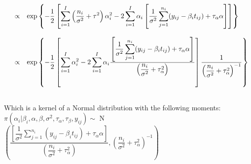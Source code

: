 \documentclass{article}
\begin{document}
\begin{equation*}
\begin{array}{lcl ll }
& \propto & \mbox{exp}\left\{ - \dfrac{1}{2} \left[ \displaystyle\sum_{i=1}^{I} \left(\dfrac{n_i}{\sigma^2} + \tau^2\right) \alpha_i^2 - 2\displaystyle\sum_{i=1}^{I} \alpha_i \left[ \dfrac{1}{\sigma^2}\displaystyle\sum_{j=1}^{n_i}( y_{ij} - \beta_i t_{ij}) + \tau_{\alpha} \alpha \right]\right]\right\} \\ \\

& \propto & \mbox{exp}\left\{ - \dfrac{1}{2} \left[ \displaystyle\sum_{i=1}^{I} \alpha_i^2 - 2\displaystyle\sum_{i=1}^{I} \alpha_i \dfrac{\left[ \dfrac{1}{\sigma^2}\displaystyle\sum_{j=1}^{n_i}( y_{ij} - \beta_i t_{ij}) + \tau_{\alpha} \alpha \right]}{\left(\dfrac{n_i}{\sigma^2} + \tau_{\alpha}^2\right)}\right] \dfrac{1}{\left(\dfrac{n_i}{\sigma^2} + \tau_{\alpha}^2\right)^{-1}} \right\} \\ \\

 \end{array}
\end{equation*}

Which is a kernel of a Normal distribution with the following moments:\\

$\pi(\alpha_i|\beta_i, \alpha, \beta, \sigma^2, \tau_\alpha, \tau_\beta, y_{ij}) \sim $ N $\left( \dfrac{\left[ \dfrac{1}{\sigma^2}\displaystyle\sum_{j=1}^{n_i}( y_{ij} - \beta_i t_{ij}) + \tau_{\alpha} \alpha \right]}{\left(\dfrac{n_i}{\sigma^2} + \tau_{\alpha}^2\right)}, \left(\dfrac{n_i}{\sigma^2} + \tau_{\alpha}^2\right)^{-1} \right)$
\end{document}
